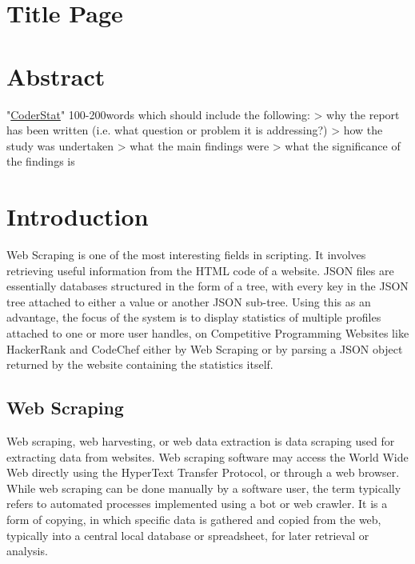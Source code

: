 \documentclass[12pt,a4paper]{report}
\begin{document}

\newpage
\chapter*{Title Page}

\newpage
\chapter*{Abstract}
"\underline{CoderStat}" 100-200words which should include the following:
> why the report has been written (i.e. what question or problem it is addressing?)
> how the study was undertaken
> what the main findings were
> what the significance of the findings is

\newpage

\tableofcontents


\newpage
\chapter{Introduction}

Web Scraping is one of the most interesting fields in scripting. It involves retrieving useful information from the HTML code of a website.
JSON files are essentially databases structured in the form of a tree, with every key in the JSON tree attached to either a value or another JSON sub-tree.
Using this as an advantage, the focus of the system is to display statistics of multiple profiles attached to one or more user handles, on Competitive Programming Websites like HackerRank and CodeChef either by Web Scraping or by parsing a JSON object returned by the website containing the statistics itself.

\section{Web Scraping}
Web scraping, web harvesting, or web data extraction is data scraping used for extracting data from websites. Web scraping software may access the World Wide Web directly using the HyperText Transfer Protocol, or through a web browser. While web scraping can be done manually by a software user, the term typically refers to automated processes implemented using a bot or web crawler. It is a form of copying, in which specific data is gathered and copied from the web, typically into a central local database or spreadsheet, for later retrieval or analysis.
\end{document}
